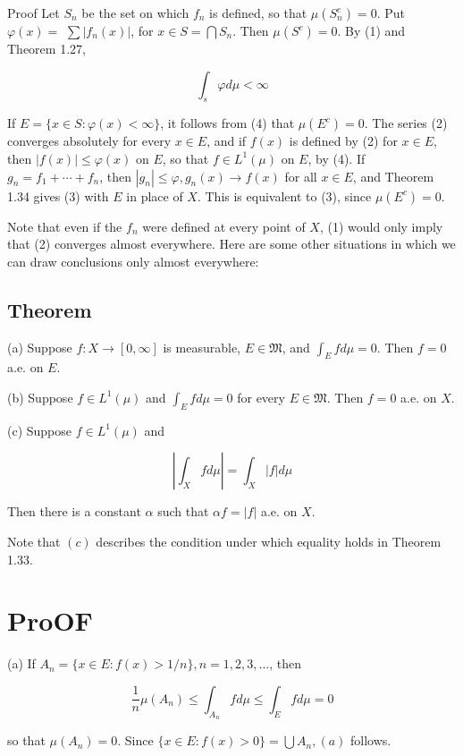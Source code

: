 \documentclass[10pt]{article}
\begin{document}
Proof Let $S_{n}$ be the set on which $f_{n}$ is defined, so that $\mu\left(S_{n}^{c}\right)=0$. Put $\varphi(x)=$ $\sum\left|f_{n}(x)\right|$, for $x \in S=\bigcap S_{n}$. Then $\mu\left(S^{c}\right)=0$. By (1) and Theorem 1.27,

$$
\int_{s} \varphi d \mu<\infty
$$

If $E=\{x \in S: \varphi(x)<\infty\}$, it follows from (4) that $\mu\left(E^{c}\right)=0$. The series (2) converges absolutely for every $x \in E$, and if $f(x)$ is defined by (2) for $x \in E$, then $|f(x)| \leq \varphi(x)$ on $E$, so that $f \in L^{1}(\mu)$ on $E$, by (4). If $g_{n}=f_{1}+\cdots+f_{n}$, then $\left|g_{n}\right| \leq \varphi, g_{n}(x) \rightarrow f(x)$ for all $x \in E$, and Theorem 1.34 gives (3) with $E$ in place of $X$. This is equivalent to (3), since $\mu\left(E^{c}\right)=0$.

Note that even if the $f_{n}$ were defined at every point of $X$, (1) would only imply that (2) converges almost everywhere. Here are some other situations in which we can draw conclusions only almost everywhere:

\subsection{Theorem}
(a) Suppose $f: X \rightarrow[0, \infty]$ is measurable, $E \in \mathfrak{M}$, and $\int_{E} f d \mu=0$. Then $f=0$ a.e. on $E$.

(b) Suppose $f \in L^{1}(\mu)$ and $\int_{E} f d \mu=0$ for every $E \in \mathfrak{M}$. Then $f=0$ a.e. on $X$.

(c) Suppose $f \in L^{1}(\mu)$ and

$$
\left|\int_{X} f d \mu\right|=\int_{X}|f| d \mu
$$

Then there is a constant $\alpha$ such that $\alpha f=|f|$ a.e. on $X$.

Note that $(c)$ describes the condition under which equality holds in Theorem 1.33.

\section{ProOF}
(a) If $A_{n}=\{x \in E: f(x)>1 / n\}, n=1,2,3, \ldots$, then

$$
\frac{1}{n} \mu\left(A_{n}\right) \leq \int_{A_{n}} f d \mu \leq \int_{E} f d \mu=0
$$

so that $\mu\left(A_{n}\right)=0$. Since $\{x \in E: f(x)>0\}=\bigcup A_{n},(a)$ follows.
\end{document}
